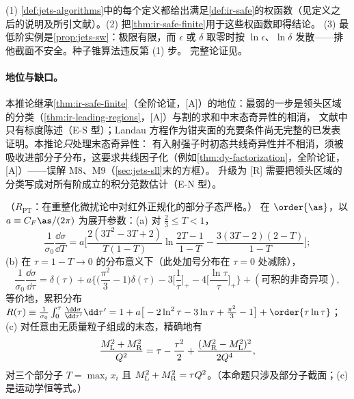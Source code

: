 \begin{proofsketch}
(1) \cref{def:jets-algorithms}中的每个定义都给出满足\cref{def:ir-safe}的权函数（见定义之后的说明及所引文献）。(2) 把\cref{thm:ir-safe-finite}用于这些权函数即得结论。
(3) 最低阶实例是\cref{prop:jets-sw}：极限有限，而 $\epsilon$ 或 $\delta$ 取零时按 $\ln\epsilon$、$\ln\delta$ 发散——排他截面不安全。种子锥算法违反第 (1) 步。
完整论证见\cite{Sterman1978a,Sterman1978b,Sterman:1979uw,StermanWeinberg1977}。
\end{proofsketch}

\paragraph{地位与缺口。}
本推论继承\cref{thm:ir-safe-finite}（全阶论证，[A]）的地位：最弱的一步是领头区域的分类（\cref{thm:ir-leading-regions}，[A]）与割的求和中末态奇异性的相消，
文献中只有标度陈述（E-S 型）；Landau 方程作为钳夹面的充要条件尚无完整的已发表证明\cite[第~5.4.3~节]{Collins2011}。本推论\emph{只}处理末态奇异性：
有入射强子时初态共线奇异性并不相消，须被吸收进部分子分布，这要求共线因子化（例如\cref{thm:dy-factorization}，全阶论证，[A]）——误解 M8、M9（\cref{sec:jets-sll}末的方框）。
升级为 [R] 需要把领头区域的分类写成对所有阶成立的积分范数估计（E-N 型）。

\begin{proposition}\label{prop:jets-thrust-lo}
（$R_{\mathrm{PT}}$：在重整化微扰论中对红外正规化的部分子态严格。）
在 $\order{\as}$，以 $a\equiv C_F\as/(2\pi)$ 为展开参数：(a) 对 $\frac23\le T<1$，
\begin{equation}\label{eq:jets-thrust-lo}
\frac{1}{\sigma_0}\frac{\dd\sigma}{\dd T}=a\Big[\frac{2(3T^2-3T+2)}{T(1-T)}\ln\frac{2T-1}{1-T}-\frac{3(3T-2)(2-T)}{1-T}\Big];
\end{equation}
(b) 在 $\tau=1-T\to0$ 的分布意义下（此处加号分布在 $\tau=0$ 处减除），
\begin{equation}\label{eq:jets-thrust-sing}
\frac{1}{\sigma_0}\frac{\dd\sigma}{\dd\tau}=\delta(\tau)+a\Big\{\Big(\frac{\pi^2}{3}-1\Big)\delta(\tau)-3\Big[\frac1\tau\Big]_+-4\Big[\frac{\ln\tau}{\tau}\Big]_+\Big\}+(\text{可积的非奇异项}),
\end{equation}
等价地，累积分布 $R(\tau)\equiv\frac1{\sigma_0}\int_0^\tau\frac{\dd\sigma}{\dd\tau'}\dd\tau'=1+a\big[-2\ln^2\tau-3\ln\tau+\frac{\pi^2}{3}-1\big]+\order{\tau\ln\tau}$；
(c) 对任意由无质量粒子组成的末态，精确地有
\begin{equation}\label{eq:jets-hemi}
\frac{M_{\rm L}^2+M_{\rm R}^2}{Q^2}=\tau-\frac{\tau^2}{2}+\frac{(M_{\rm R}^2-M_{\rm L}^2)^2}{2Q^4},
\end{equation}
对三个部分子 $T=\max_ix_i$ 且 $M_{\rm L}^2+M_{\rm R}^2=\tau Q^2$。（本命题只涉及部分子截面；(c) 是运动学恒等式。）
\end{proposition}

